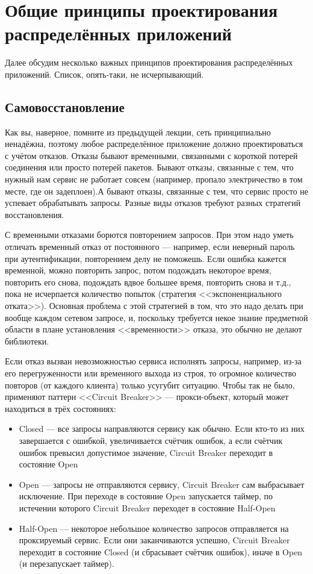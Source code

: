 \documentclass{../text-style}
\begin{document}
\section{Общие принципы проектирования распределённых приложений}

Далее обсудим несколько важных принципов проектирования распределённых приложений. Список, опять-таки, не исчерпывающий.

\subsection{Самовосстановление}

Как вы, наверное, помните из предыдущей лекции, сеть принципиально ненадёжна, поэтому любое распределённое приложение должно проектироваться с учётом отказов. Отказы бывают временными, связанными с короткой потерей соединения или просто потерей пакетов. Бывают отказы, связанные с тем, что нужный нам сервис не работает совсем (например, пропало электричество в том месте, где он задеплоен).А бывают отказы, связанные с тем, что сервис просто не успевает обрабатывать запросы. Разные виды отказов требуют разных стратегий восстановления.

С временными отказами борются повторением запросов. При этом надо уметь отличать временный отказ от постоянного --- например, если неверный пароль при аутентификации, повторением делу не поможешь. Если ошибка кажется временной, можно повторить запрос, потом подождать некоторое время, повторить его снова, подождать вдвое большее время, повторить снова и т.д., пока не исчерпается количество попыток (стратегия <<экспоненциального отката>>). Основная проблема с этой стратегией в том, что это надо делать при вообще каждом сетевом запросе, и, поскольку требуется некое знание предметной области в плане установления <<временности>> отказа, это обычно не делают библиотеки.

Если отказ вызван невозможностью сервиса исполнять запросы, например, из-за его перегруженности или временного выхода из строя, то огромное количество повторов (от каждого клиента) только усугубит ситуацию. Чтобы так не было, применяют паттерн <<Circuit Breaker>> --- прокси-объект, который может находиться в трёх состояниях:

\begin{itemize}
    \item Closed --- все запросы направляются сервису как обычно. Если кто-то из них завершается с ошибкой, увеличивается счётчик ошибок, а если счётчик ошибок превысил допустимое значение, Circuit Breaker переходит в состояние Open
    \item Open --- запросы не отправляются сервису, Circuit Breaker сам выбрасывает исключение. При переходе в состояние Open запускается таймер, по истечении которого Circuit Breaker переходет в состояние Half-Open
    \item Half-Open --- некоторое небольшое количество запросов отправляется на проксируемый сервис. Если они заканчиваются успешно, Circuit Breaker переходит в состояние Closed (и сбрасывает счётчик ошибок), иначе в Open (и перезапускает таймер).
\end{itemize}
\end{document}

